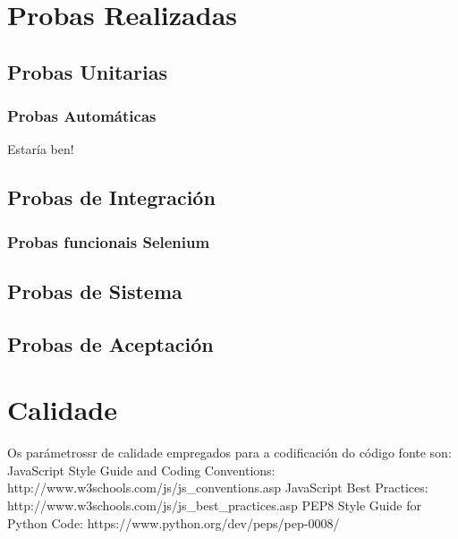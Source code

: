 \chapter{Probas Realizadas}

\section{Probas Unitarias}
  \subsection{Probas Automáticas}
  Estaría ben!

\section{Probas de Integración}
  \subsection{Probas funcionais Selenium}


\section{Probas de Sistema}

\section{Probas de Aceptación}

\chapter{Calidade}
	Os parámetrossr de calidade empregados para a codificación do código fonte son:
		JavaScript Style Guide and Coding Conventions: http://www.w3schools.com/js/js_conventions.asp
		JavaScript Best Practices: http://www.w3schools.com/js/js_best_practices.asp
		PEP8 Style Guide for Python Code: https://www.python.org/dev/peps/pep-0008/